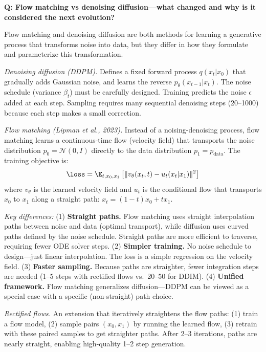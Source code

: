 \begin{interviewq}
\textbf{Q: Flow matching vs denoising diffusion---what changed and why is it considered the next evolution?}

 \quad {} \quad \badgefreq{\freqlow}

\stronganswer Flow matching and denoising diffusion are both methods for learning a generative process that transforms noise into data, but they differ in how they formulate and parameterize this transformation.

\textit{Denoising diffusion (DDPM).} Defines a fixed forward process $q(x_t | x_0)$ that gradually adds Gaussian noise, and learns the reverse $p_\theta(x_{t-1} | x_t)$. The noise schedule (variance $\beta_t$) must be carefully designed. Training predicts the noise $\epsilon$ added at each step. Sampling requires many sequential denoising steps (20--1000) because each step makes a small correction.

\textit{Flow matching (Lipman et al., 2023).} Instead of a noising-denoising process, flow matching learns a continuous-time flow (velocity field) that transports the noise distribution $p_0 = \mathcal{N}(0, I)$ directly to the data distribution $p_1 = p_{\text{data}}$. The training objective is:
$$\loss = \E_{t, x_0, x_1}\left[\|v_\theta(x_t, t) - u_t(x_t | x_1)\|^2\right]$$
where $v_\theta$ is the learned velocity field and $u_t$ is the conditional flow that transports $x_0$ to $x_1$ along a straight path: $x_t = (1-t)x_0 + t x_1$.

\textit{Key differences:} (1) \textbf{Straight paths.} Flow matching uses straight interpolation paths between noise and data (optimal transport), while diffusion uses curved paths defined by the noise schedule. Straight paths are more efficient to traverse, requiring fewer ODE solver steps. (2) \textbf{Simpler training.} No noise schedule to design---just linear interpolation. The loss is a simple regression on the velocity field. (3) \textbf{Faster sampling.} Because paths are straighter, fewer integration steps are needed (1--5 steps with rectified flows vs.\ 20--50 for DDIM). (4) \textbf{Unified framework.} Flow matching generalizes diffusion---DDPM can be viewed as a special case with a specific (non-straight) path choice.

\textit{Rectified flows.} An extension that iteratively straightens the flow paths: (1) train a flow model, (2) sample pairs $(x_0, x_1)$ by running the learned flow, (3) retrain with these paired samples to get straighter paths. After 2--3 iterations, paths are nearly straight, enabling high-quality 1--2 step generation.


\end{interviewq}
